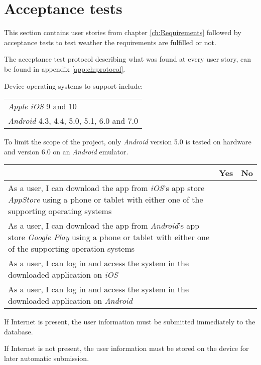 \section{Acceptance tests}
This section contains user stories from chapter \ref{ch:Requirements} followed by acceptance tests to test weather the requirements are fulfilled or not.

The acceptance test protocol describing what was found at every user story, can be found in appendix \ref{app:ch:protocol}.


Device operating systems to support include: \newline
\begin{tabularx}{\textwidth}{X}
    \textit{Apple iOS} 9 and 10 \\
    \textit{Android} 4.3, 4.4, 5.0, 5.1, 6.0 and 7.0
\end{tabularx}

To limit the scope of the project, only \textit{Android} version 5.0 is tested on hardware and version 6.0 on an \textit{Android} emulator.

\begin{tabularx}{\textwidth}{|b|c|c|}
	\hline
	 & Yes & No \\
	\hline
	As a user, I can download the app from \textit{iOS}'s app store \textit{AppStore} using a phone or tablet with either one of the supporting operating systems &   & \xmark  \\
	\hline
	As a user, I can download the app from \textit{Android}'s app store \textit{Google Play} using a phone or tablet with either one of the supporting operation systems & \xmark  &  \\
	\hline
	As a user, I can log in and access the system in the downloaded application on \textit{iOS} &  & \xmark \\
		\hline
	As a user, I can log in and access the system in the downloaded application on \textit{Android} & \xmark  &  \\
	\hline
\end{tabularx}


If Internet is present, the user information must be submitted immediately to the database.

If Internet is not present, the user information must be stored on the device for later automatic submission.

